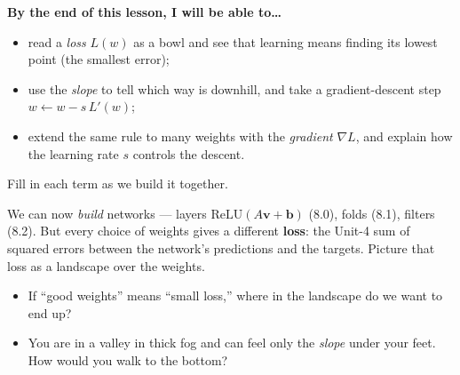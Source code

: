 \documentclass[10pt]{article}
\newcommand{\vv}{\mathbf{v}}
\newcommand{\bb}{\mathbf{b}}
\newcommand{\relu}{\mathrm{ReLU}}
\begin{document}
\namedateperiod

\vspace{0.12in}

\begin{objectivebox}
\textbf{By the end of this lesson, I will be able to\dots}
\begin{itemize}\setlength{\itemsep}{2pt}
  \item read a \emph{loss} $L(w)$ as a bowl and see that learning means finding its lowest point (the smallest error);
  \item use the \emph{slope} to tell which way is downhill, and take a gradient-descent step $w\leftarrow w-s\,L'(w)$;
  \item extend the same rule to many weights with the \emph{gradient} $\nabla L$, and explain how the learning rate $s$ controls the descent.
\end{itemize}
\end{objectivebox}

\vspace{0.06in}

\begin{vocabbox}
\small
Fill in each term as we build it together.
\vspace{2pt}
\end{vocabbox}

\begin{hookbox}
We can now \emph{build} networks --- layers $\relu(A\vv+\bb)$ (8.0), folds (8.1), filters (8.2). But every choice
of weights gives a different \textbf{loss}: the Unit-4 sum of squared errors between the network's predictions
and the targets. Picture that loss as a landscape over the weights.
\begin{itemize}\setlength{\itemsep}{1pt}
  \item If ``good weights'' means ``small loss,'' where in the landscape do we want to end up? \writeline
  \item You are in a valley in thick fog and can feel only the \emph{slope} under your feet. How would you walk to the bottom? \writeline
\end{itemize}
\end{hookbox}
\end{document}
